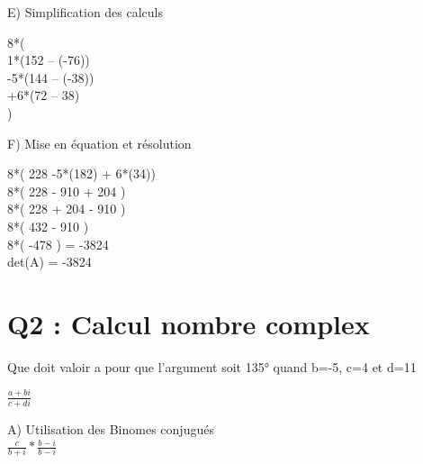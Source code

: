 E) Simplification des calculs

\vspace{5mm} %

8*(\\

  1*(152 – (-76))\\

  -5*(144 – (-38))\\

  +6*(72 – 38)\\

)

\vspace{10mm} %


F) Mise en équation et résolution \\

\vspace{5mm} %

8*( 228 -5*(182) + 6*(34))\\

8*( 228 - 910 + 204 )\\

8*( 228 + 204 - 910 )\\

8*( 432 - 910 )\\

8*( -478 ) = -3824\\

det(A) = -3824\\


\newpage

\section{Q2 : Calcul nombre complex}

\vspace{4mm} %

Que doit valoir a pour que l’argument soit 135° quand b=-5, c=4 et d=11 \\

\vspace{4mm} %

$
\frac{a+bi}{c+di}
$

\vspace{10mm} %

A) Utilisation des Binomes conjugués \\

$
\frac{c}{b+i} * \frac{b-i}{b-i}
$

